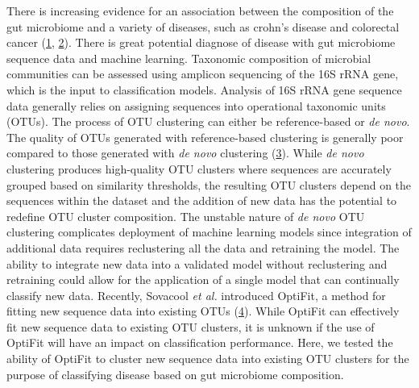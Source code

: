 \documentclass[
]{article}
\begin{document}
\newpage

There is increasing evidence for an association between the composition
of the gut microbiome and a variety of diseases, such as crohn's disease
and colorectal cancer (\protect\hyperlink{ref-Morgan2012}{1},
\protect\hyperlink{ref-Sobhani2011}{2}). There is great potential
diagnose of disease with gut microbiome sequence data and machine
learning. Taxonomic composition of microbial communities can be assessed
using amplicon sequencing of the 16S rRNA gene, which is the input to
classification models. Analysis of 16S rRNA gene sequence data generally
relies on assigning sequences into operational taxonomic units (OTUs).
The process of OTU clustering can either be reference-based or \emph{de
novo}. The quality of OTUs generated with reference-based clustering is
generally poor compared to those generated with \emph{de novo}
clustering (\protect\hyperlink{ref-westcott2015}{3}). While \emph{de
novo} clustering produces high-quality OTU clusters where sequences are
accurately grouped based on similarity thresholds, the resulting OTU
clusters depend on the sequences within the dataset and the addition of
new data has the potential to redefine OTU cluster composition. The
unstable nature of \emph{de novo} OTU clustering complicates deployment
of machine learning models since integration of additional data requires
reclustering all the data and retraining the model. The ability to
integrate new data into a validated model without reclustering and
retraining could allow for the application of a single model that can
continually classify new data. Recently, Sovacool \emph{et al.}
introduced OptiFit, a method for fitting new sequence data into existing
OTUs (\protect\hyperlink{ref-sovacool2022}{4}). While OptiFit can
effectively fit new sequence data to existing OTU clusters, it is
unknown if the use of OptiFit will have an impact on classification
performance. Here, we tested the ability of OptiFit to cluster new
sequence data into existing OTU clusters for the purpose of classifying
disease based on gut microbiome composition.
\end{document}
